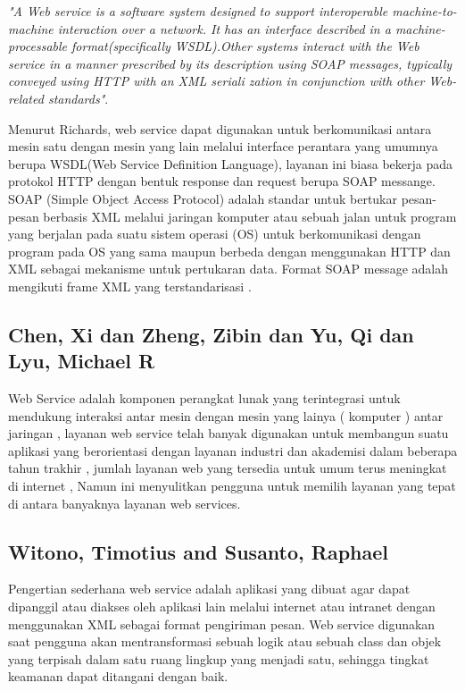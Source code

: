 \textit{"A Web service is a software system designed to support interoperable machine-to-machine interaction over a network. It has an interface described in a machine-processable format(specifically WSDL).Other systems interact with the Web service in a manner prescribed by its description using SOAP messages, typically conveyed using HTTP with an XML seriali zation in conjunction with other Web-related standards"}.

Menurut Richards, web service dapat digunakan untuk berkomunikasi antara mesin satu dengan mesin yang lain melalui interface perantara yang umumnya berupa WSDL(Web Service Definition Language), layanan ini biasa bekerja pada protokol HTTP dengan bentuk response dan request berupa SOAP messange. SOAP (Simple Object Access Protocol) adalah standar untuk bertukar pesan-pesan berbasis XML melalui jaringan komputer atau sebuah jalan untuk program yang berjalan pada suatu sistem operasi (OS) untuk berkomunikasi dengan program pada OS yang sama maupun berbeda dengan menggunakan HTTP dan XML sebagai mekanisme untuk pertukaran data. Format SOAP message adalah mengikuti frame XML yang terstandarisasi \cite{ihya2011pembuatan}. 

\subsection{Chen, Xi dan Zheng, Zibin dan Yu, Qi dan Lyu, Michael R}

	Web Service adalah komponen perangkat lunak yang terintegrasi untuk mendukung interaksi antar mesin dengan mesin yang lainya ( komputer ) antar jaringan , layanan web service telah banyak digunakan untuk membangun suatu aplikasi yang berorientasi dengan layanan industri dan akademisi dalam beberapa tahun trakhir , jumlah layanan web yang tersedia untuk umum terus meningkat di internet , Namun  ini menyulitkan pengguna untuk memilih layanan yang tepat di antara banyaknya layanan web services\cite{chen2014web}.

\subsection{Witono, Timotius and Susanto, Raphael}

	Pengertian sederhana web service adalah aplikasi yang dibuat agar dapat dipanggil atau diakses oleh aplikasi lain melalui internet atau intranet dengan menggunakan XML sebagai format pengiriman pesan. Web service digunakan saat pengguna akan mentransformasi sebuah logik atau sebuah class dan objek yang terpisah dalam satu ruang lingkup yang menjadi satu, sehingga tingkat keamanan dapat ditangani dengan baik\cite{witono201511}.

